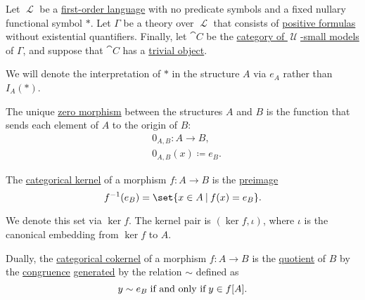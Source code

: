 \begin{proposition}\label{thm:zero_morphisms_pointed}
  Let \( \mscrL \) be a \hyperref[def:first_order_language]{first-order language} with no predicate symbols and a fixed nullary functional symbol \( \ast \). Let \( \Gamma \) be a theory over \( \mscrL \) that consists of \hyperref[def:positive_formula]{positive formulas} without existential quantifiers. Finally, let \( \cat{C} \) be the \hyperref[def:category_of_small_first_order_models]{category of \( \mscrU \)-small models} of \( \Gamma \), and suppose that \( \cat{C} \) has a \hyperref[def:trivial_object]{trivial object}.

  We will denote the interpretation of \( \ast \) in the structure \( A \) via \( e_A \) rather than \( I_A(\ast) \).

  \begin{thmenum}
     The unique \hyperref[def:zero_morphisms/morphism]{zero morphism} between the structures \( A \) and \( B \) is the function that sends each element of \( A \) to the origin of \( B \):
    \begin{equation*}
      \begin{aligned}
        &0_{A,B}: A \to B, \\
        &0_{A,B}(x) \coloneqq e_B.
      \end{aligned}
    \end{equation*}

     The \hyperref[def:zero_morphisms/kernel]{categorical kernel} of a morphism \( f: A \to B \) is the \hyperref[def:set_valued_map/inverse]{preimage}
    \begin{equation*}
      f^{-1}(e_B) = \set{ x \in A \given f(x) = e_B }.
    \end{equation*}

    We denote this set via \( \ker f \). The kernel pair is \( (\ker f, \iota) \), where \( \iota \) is the canonical embedding from \( \ker f \) to \( A \).

     Dually, the \hyperref[def:zero_morphisms/cokernel]{categorical cokernel} of a morphism \( f: A \to B \) is the \hyperref[def:first_order_quotient]{quotient} of \( B \) by the \hyperref[def:first_order_congruence]{congruence} \hyperref[def:first_order_generated_congruence]{generated} by the relation \( {\sim} \) defined as
    \begin{equation*}
      y \sim e_B \T{if and only if} y \in f[A].
    \end{equation*}


\end{thmenum}
\end{proposition}
